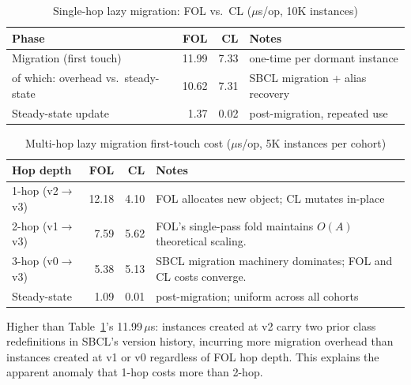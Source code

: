 \documentclass[sigconf,nonacm]{acmart}
\begin{document}
\begin{table}[htbp]
\small
\centering
\caption{Single-hop lazy migration: FOL vs.\ CL ($\mu$s/op, 10K instances)}
\label{tab:schema-evo-single}
\begin{tabularx}{\columnwidth}{>{\raggedright\arraybackslash\hsize=0.6\hsize}X r r >{\raggedright\arraybackslash\hsize=1.4\hsize}X}
\toprule
\textbf{Phase} & \textbf{FOL} & \textbf{CL} & \textbf{Notes} \\
\midrule
Migration (first touch) & 11.99 & 7.33 & one-time per dormant instance \\
\quad of which: overhead vs.\ steady-state & 10.62 & 7.31 & SBCL migration + alias recovery \\
Steady-state update & 1.37 & 0.02 & post-migration, repeated use \\
\bottomrule
\end{tabularx}
\end{table}

\begin{table}[htbp]
\small
\centering
\caption{Multi-hop lazy migration first-touch cost ($\mu$s/op, 5K instances per cohort)}
\label{tab:schema-evo-multi}
\begin{threeparttable}
\begin{tabularx}{\columnwidth}{lrrX}
\toprule
\textbf{Hop depth} & \textbf{FOL} & \textbf{CL} & \textbf{Notes} \\
\midrule
1-hop (v2$\to$v3) & 12.18\tnote{b} & 4.10 & FOL allocates new object; CL mutates in-place \\
2-hop (v1$\to$v3) & 7.59 & 5.62 & FOL's single-pass fold maintains $O(A)$ theoretical scaling. \\
3-hop (v0$\to$v3) & 5.38 & 5.13 & SBCL migration machinery dominates; FOL and CL costs converge. \\
\midrule
Steady-state & 1.09 & 0.01 & post-migration; uniform across all cohorts \\
\bottomrule
\end{tabularx}
\begin{tablenotes}
  \footnotesize
  \item[b] Higher than Table~\ref{tab:schema-evo-single}'s 11.99\,$\mu$s: instances created at v2 carry two prior class redefinitions in SBCL's version history, incurring more migration overhead than instances created at v1 or v0 regardless of FOL hop depth.
  This explains the apparent anomaly that 1-hop costs more than 2-hop.
\end{tablenotes}
\end{threeparttable}
\end{table}
\end{document}
